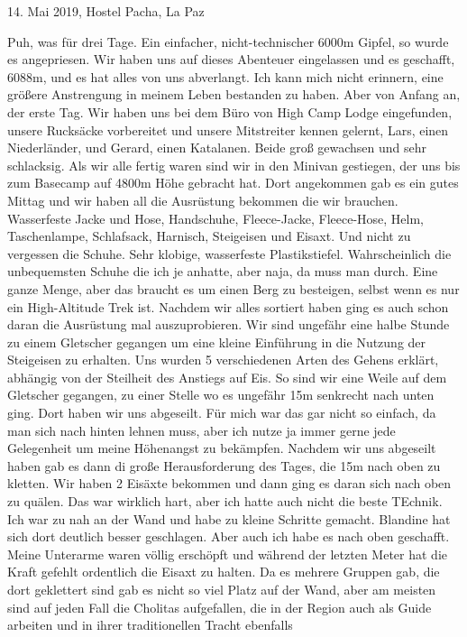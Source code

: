 \documentclass[11pt]{book}
\begin{document}
14. Mai 2019, Hostel Pacha, La Paz

Puh, was für drei Tage. Ein einfacher, nicht-technischer 6000m Gipfel, so wurde es angepriesen. Wir haben uns auf dieses Abenteuer eingelassen und 
es geschafft, 6088m, und es hat alles von uns abverlangt. Ich kann mich nicht erinnern, eine größere Anstrengung in meinem Leben bestanden zu haben. 
Aber von Anfang an, der erste Tag. Wir haben uns bei dem Büro von High Camp Lodge eingefunden, unsere Rucksäcke vorbereitet und unsere Mitstreiter 
kennen gelernt, Lars, einen Niederländer, und Gerard, einen Katalanen. Beide groß gewachsen und sehr schlacksig. Als wir alle fertig waren sind wir in 
den Minivan gestiegen, der uns bis zum Basecamp auf 4800m Höhe gebracht hat. Dort angekommen gab es ein gutes Mittag und wir haben all die Ausrüstung 
bekommen die wir brauchen. Wasserfeste Jacke und Hose, Handschuhe, Fleece-Jacke, Fleece-Hose, Helm, Taschenlampe, Schlafsack, Harnisch, Steigeisen und Eisaxt. 
Und nicht zu vergessen die Schuhe. Sehr klobige, wasserfeste Plastikstiefel. Wahrscheinlich die unbequemsten Schuhe die ich je anhatte, aber naja, da muss man durch.
Eine ganze Menge, aber das braucht es um einen Berg zu besteigen, selbst wenn es nur ein High-Altitude Trek ist. Nachdem wir alles sortiert haben ging 
es auch schon daran die Ausrüstung mal auszuprobieren. Wir sind ungefähr eine halbe Stunde zu einem Gletscher gegangen um eine kleine Einführung in die 
Nutzung der Steigeisen zu erhalten. Uns wurden 5 verschiedenen Arten des Gehens erklärt, abhängig von der Steilheit des Anstiegs auf Eis. So sind wir 
eine Weile auf dem Gletscher gegangen, zu einer Stelle wo es ungefähr 15m senkrecht nach unten ging. Dort haben wir uns abgeseilt. Für mich war das 
gar nicht so einfach, da man sich nach hinten lehnen muss, aber ich nutze ja immer gerne jede Gelegenheit um meine Höhenangst zu bekämpfen. Nachdem 
wir uns abgeseilt haben gab es dann di große Herausforderung des Tages, die 15m nach oben zu kletten. Wir haben 2 Eisäxte bekommen und dann ging es daran 
sich nach oben zu quälen. Das war wirklich hart, aber ich hatte auch nicht die beste TEchnik. Ich war zu nah an der Wand und habe zu kleine Schritte gemacht. 
Blandine hat sich dort deutlich besser geschlagen. Aber auch ich habe es nach oben geschafft. Meine Unterarme waren völlig erschöpft und während der letzten 
Meter hat die Kraft gefehlt ordentlich die Eisaxt zu halten. Da es mehrere Gruppen gab, die dort geklettert sind gab es nicht so viel Platz auf der 
Wand, aber am meisten sind auf jeden Fall die Cholitas aufgefallen, die in der Region auch als Guide arbeiten und in ihrer traditionellen Tracht ebenfalls 
\end{document}
